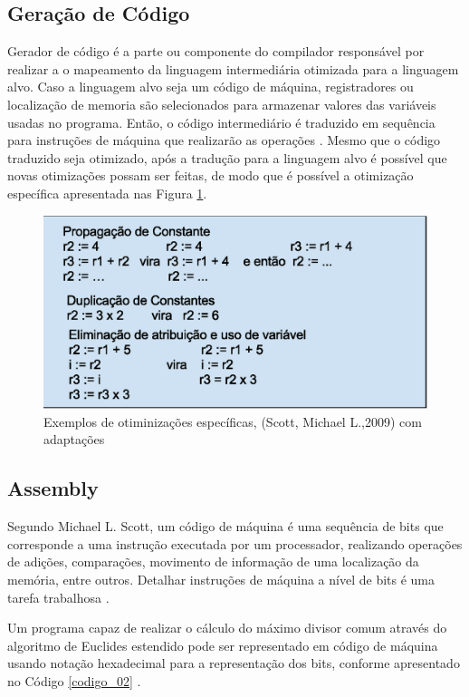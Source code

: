 \subsection{Geração de Código}

Gerador de código é a parte ou componente do compilador responsável por 
realizar a o mapeamento da linguagem intermediária otimizada para a linguagem 
alvo. Caso a linguagem alvo seja um código de máquina,  registradores ou 
localização de memoria são selecionados para armazenar valores das 
variáveis usadas no programa. Então, o código intermediário é traduzido em 
sequência para instruções de máquina que realizarão as operações \cite{ref32}.
Mesmo que o código traduzido seja otimizado, após a tradução para a 
linguagem alvo é  possível que novas otimizações possam ser feitas, de modo 
que é possível a otimização específica apresentada nas Figura \ref{fig02}.

\begin{figure}[h]
    \centering
        \includegraphics[keepaspectratio=true,scale=0.7]{figuras/otimizacao_especifica.eps}
    \caption{Exemplos de otiminizações específicas,
             (Scott, Michael L.,2009) com adaptações }
    \label{fig02}
\end{figure}


\subsection{Assembly}

Segundo Michael L. Scott, um código de máquina é uma sequência de bits que
 corresponde a uma instrução executada por um processador, realizando 
operações de adições, comparações, movimento de informação de uma localização
 da memória, entre outros. Detalhar instruções de máquina a nível de bits é 
uma tarefa trabalhosa \cite{ref34}. 

Um programa capaz de realizar o cálculo do máximo divisor comum através do 
algoritmo de Euclides estendido pode ser representado  em código de máquina 
usando notação hexadecimal para a representação dos bits, conforme apresentado
 no Código \ref{codigo_02} \cite{ref34}.


